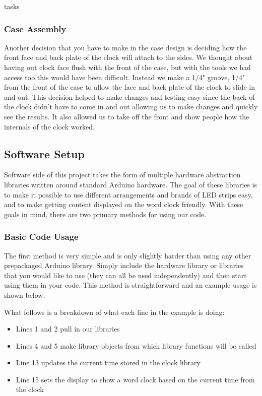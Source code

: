 tasks\documentclass[onecolumn, draftclsnofoot,10pt, compsoc]{IEEEtran}
\begin{document}
\subsubsection{Case Assembly}
Another decision that you have to make in the case design is deciding how the front face and back plate of the clock will attach to the sides.
We thought about having out clock face flush with the front of the case, but with the tools we had access too this would have been difficult.
Instead we make a 1/4" groove, 1/4" from the front of the case to allow the face and back plate of the clock to slide in and out.
This decision helped to make changes and testing easy since the back of the clock didn't have to come in and out allowing us to make changes and quickly see the results.
It also allowed us to take off the front and show people how the internals of the clock worked.

\subsection{Software Setup}
Software side of this project takes the form of multiple hardware abstraction libraries written around standard Arduino hardware.
The goal of these libraries is to make it possible to use different arrangements and brands of LED strips easy, and to make getting content displayed on the word clock friendly.
With these goals in mind, there are two primary methods for using our code.

\subsubsection{Basic Code Usage}

The first method is very simple and is only slightly harder than using any other prepackaged Arduino library.
Simply include the hardware library or libraries that you would like to use (they can all be used independently) and then start using them in your code.
This method is straightforward and an example usage is shown below.



What follows is a breakdown of what each line in the example is doing:
\begin{itemize}
	\item Lines 1 and 2 pull in our libraries
	\item Lines 4 and 5 make library objects from which library functions will be called
	\item Line 13 updates the current time stored in the clock library
	\item Line 15 sets the display to show a word clock based on the current time from the clock
\end{itemize}
\end{document}
